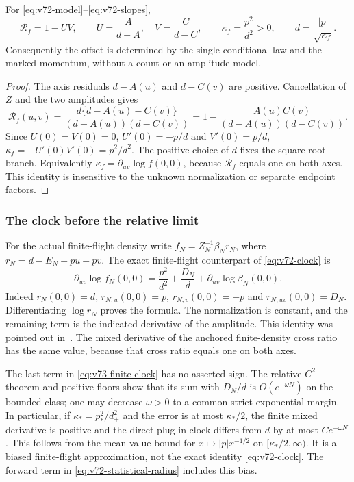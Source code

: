 \begin{proposition}
\label{prop:v72-clock}
For \eqref{eq:v72-model}--\eqref{eq:v72-slopes},
\begin{equation}\label{eq:v72-clock}
 \mathcal R_f=1-UV,\qquad U=\frac{A}{d-A},\quad V=\frac{C}{d-C},
 \qquad \kappa_f=\frac{p^2}{d^2}>0,\qquad
 d=\frac{|p|}{\sqrt{\kappa_f}}.
\end{equation}
Consequently the offset is determined by the single conditional law and
the marked momentum, without a count or an amplitude model.
\end{proposition}
\begin{proof}
The axis residuals $d-A(u)$ and $d-C(v)$ are positive.  Cancellation of
$Z$ and the two amplitudes gives
\[
 \mathcal R_f(u,v)=
 \frac{d\{d-A(u)-C(v)\}}{(d-A(u))(d-C(v))}
 =1-\frac{A(u)C(v)}{(d-A(u))(d-C(v))}.
\]
Since $U(0)=V(0)=0$, $U'(0)=-p/d$ and $V'(0)=p/d$,
$\kappa_f=-U'(0)V'(0)=p^2/d^2$.  The positive choice of $d$ fixes the
square-root branch.  Equivalently $\kappa_f=\partial_{uv}\log f(0,0)$,
because $\mathcal R_f$ equals one on both axes.  This identity is
insensitive to the unknown normalization or separate endpoint factors.
\end{proof}

\subsubsection*{The clock before the relative limit}
For the actual finite-flight density write
$f_N=Z_N^{-1}\beta_Nr_N$, where $r_N=d-E_N+pu-pv$.
The exact finite-flight counterpart of \eqref{eq:v72-clock} is
\begin{equation}\label{eq:v73-finite-clock}
 \partial_{uv}\log f_N(0,0)
 =\frac{p^2}{d^2}+\frac{D_N}{d}
                +\partial_{uv}\log\beta_N(0,0).
\end{equation}
Indeed $r_N(0,0)=d$, $r_{N,u}(0,0)=p$,
$r_{N,v}(0,0)=-p$ and $r_{N,uv}(0,0)=D_N$.
Differentiating $\log r_N$ proves the formula.  The normalization
is constant, and the remaining term is the indicated derivative of the
amplitude.  This identity was pointed out in~\cite{A2ReviewV72}.
The mixed derivative of the anchored finite-density cross ratio has
the same value, because that cross ratio equals one on both axes.

The last term in \eqref{eq:v73-finite-clock} has no asserted sign.
The relative $C^2$ theorem and positive floors show that its sum with
$D_N/d$ is $O(e^{-\omega N})$ on the bounded class; one may decrease
$\omega>0$ to a common strict exponential margin.  In particular, if
$\kappa_*=p_*^2/d_+^2$ and the error is at most $\kappa_*/2$, the
finite mixed derivative is positive and the direct plug-in clock differs
from $d$ by at most $Ce^{-\omega N}$.  This follows from the mean value
bound for $x\mapsto |p|x^{-1/2}$ on $[\kappa_*/2,\infty)$.
It is a biased finite-flight approximation, not the exact identity
\eqref{eq:v72-clock}.  The forward term in
\eqref{eq:v72-statistical-radius} includes this bias.

